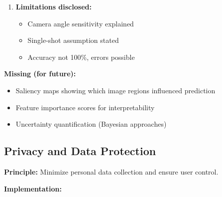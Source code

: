 \documentclass[11pt,a4paper]{article}
\begin{document}
\begin{enumerate}
\item \textbf{Limitations disclosed:}
   \begin{itemize}
   \item Camera angle sensitivity explained
   \item Single-shot assumption stated
   \item Accuracy not 100\%, errors possible
   \end{itemize}
\end{enumerate}

\textbf{Missing (for future):}
\begin{itemize}
\item Saliency maps showing which image regions influenced prediction
\item Feature importance scores for interpretability
\item Uncertainty quantification (Bayesian approaches)
\end{itemize}

\subsection{Privacy and Data Protection}

\textbf{Principle:} Minimize personal data collection and ensure user control.

\textbf{Implementation:}
\end{document}
